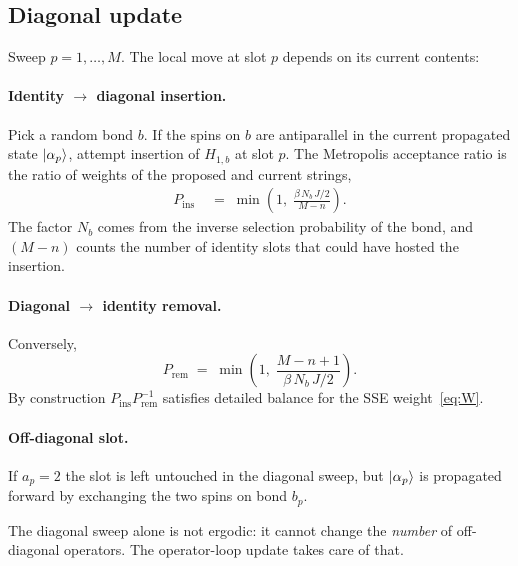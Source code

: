 \documentclass[11pt,a4paper]{article}
\newcommand{\Nb}{N_{b}}
\theoremstyle{definition}
\theoremstyle{plain}
\begin{document}
\subsection{Diagonal update}\label{sec:diag-update}
Sweep $p=1,\dots,M$. The local move at slot $p$ depends on its
current contents:

\paragraph{Identity $\to$ diagonal insertion.}
Pick a random bond $b$. If the spins on $b$ are antiparallel in the
current propagated state $\ket{\alpha_p}$, attempt insertion of
$H_{1,b}$ at slot $p$. The Metropolis acceptance ratio is the ratio
of weights of the proposed and current strings,
\begin{align}
    P_{\text{ins}} &\;=\;
        \min\!\left(1,\;
        \frac{\beta\,\Nb\,J/2}{M-n}\right). \label{eq:Pins}
\end{align}
The factor $\Nb$ comes from the inverse selection probability of the
bond, and $(M-n)$ counts the number of identity slots that could
have hosted the insertion.

\paragraph{Diagonal $\to$ identity removal.}
Conversely,
\begin{equation}
    P_{\text{rem}} \;=\; \min\!\left(1,\;
        \frac{M-n+1}{\beta\,\Nb\,J/2}\right). \label{eq:Prem}
\end{equation}
By construction $P_{\text{ins}}P_{\text{rem}}^{-1}$ satisfies detailed
balance for the SSE weight~\cref{eq:W}.

\paragraph{Off-diagonal slot.}
If $a_p=2$ the slot is left untouched in the diagonal sweep, but
$\ket{\alpha_p}$ is propagated forward by exchanging the two spins
on bond $b_p$.

\medskip
The diagonal sweep alone is not ergodic: it cannot change the
\emph{number} of off-diagonal operators. The operator-loop update
takes care of that.
\end{document}
